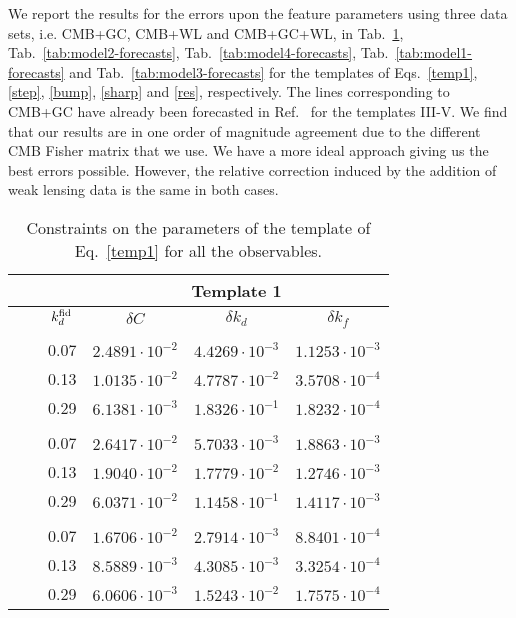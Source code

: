 \documentclass[12pt]{article}
\begin{document}
We report the results for the errors upon the feature parameters using three data sets, i.e. CMB+GC, CMB+WL and CMB+GC+WL, in Tab.~\ref{tab:model5-forecasts}, Tab.~\ref{tab:model2-forecasts}, Tab.~\ref{tab:model4-forecasts}, Tab.~\ref{tab:model1-forecasts} and Tab.~\ref{tab:model3-forecasts} for the templates of Eqs.~\eqref{temp1}, \eqref{step}, \eqref{bump}, \eqref{sharp} and \eqref{res}, respectively. The lines corresponding to CMB+GC have already been forecasted in Ref.~\cite{Chen:2016vvw} for the templates III-V. We find that our results are in one order of magnitude agreement due to the different CMB Fisher matrix that we use. We have a more ideal approach giving us the best errors possible. However, the relative correction induced by the addition of weak lensing data is the same in both cases.
%
\begin{table}[H]
\begin{centering}\begin{tabular}{cccccc}
\toprule
& & & \multicolumn{3}{c}{\textbf{ Template 1} }  \tabularnewline
 \toprule
\multicolumn{2}{c}{}& $k_d^{\rm fid}$ & $\delta C$ & $\delta  k_{d}$ & $\delta k_f$   \tabularnewline
 \rowcolor{gray}\multicolumn{1}{l}{\bf{CMB} + {\bf GC} }& &\multicolumn{4}{c}{ }  \tabularnewline
  & & 0.07 & $2.4891 \cdot 10^{-2}$ & $4.4269 \cdot 10^{-3}$ & $1.1253 \cdot 10^{-3}$ \\ \hline
    & & 0.13 & $1.0135 \cdot 10^{-2}$ & $4.7787 \cdot 10^{-2}$ & $3.5708 \cdot 10^{-4}$ \\ \hline
      & & 0.29 & $6.1381 \cdot 10^{-3}$ & $1.8326 \cdot 10^{-1}$ & $1.8232 \cdot 10^{-4}$
    \tabularnewline
 \rowcolor{gray} \multicolumn{1}{l}{\bf{CMB} + {\bf WL} }& &\multicolumn{4}{c}{ }  \tabularnewline
& &0.07 & $2.6417 \cdot 10^{-2}$ & $5.7033 \cdot 10^{-3}$ & $1.8863 \cdot 10^{-3}$ \\\hline
& &0.13 & $1.9040 \cdot 10^{-2}$ & $1.7779 \cdot 10^{-2}$ & $1.2746 \cdot 10^{-3}$ \\\hline
& &0.29 & $6.0371 \cdot 10^{-2}$ & $1.1458 \cdot 10^{-1}$ & $1.4117 \cdot 10^{-3}$ \tabularnewline
 \rowcolor{gray} \multicolumn{1}{l}{ \bf{CMB} + \bf{GC}+\bf{WL} }& &\multicolumn{4}{c}{ }  \tabularnewline
  & &0.07 & $1.6706 \cdot 10^{-2}$ & $2.7914 \cdot 10^{-3}$ & $8.8401 \cdot 10^{-4}$ \\\hline
    & &0.13 & $8.5889 \cdot 10^{-3}$ & $4.3085 \cdot 10^{-3}$ & $3.3254 \cdot 10^{-4}$ \\\hline
      & &0.29 & $6.0606 \cdot 10^{-3}$ & $1.5243 \cdot 10^{-2}$ & $1.7575 \cdot 10^{-4}$ 
  \tabularnewline
\bottomrule	
\end{tabular}\par\end{centering}
\caption{Constraints on the parameters of the template of Eq.~\eqref{temp1} for all the observables.
\label{tab:model5-forecasts}}
\end{table}
\end{document}
